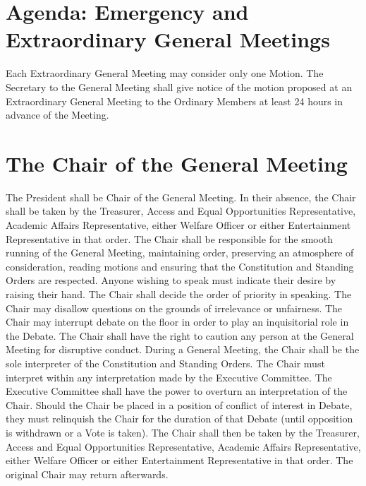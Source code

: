 \section{Agenda: Emergency and Extraordinary General Meetings}
\npara Each Extraordinary General Meeting may consider only one Motion.
\npara The Secretary to the General Meeting shall give notice of the motion proposed at an Extraordinary General Meeting to the Ordinary Members at least 24 hours in advance of the Meeting.
\section{The Chair of the General Meeting}
\npara The President shall be Chair of the General Meeting. In their absence, the Chair shall be taken by the Treasurer, Access and Equal Opportunities Representative, Academic Affairs Representative, either Welfare Officer or either Entertainment Representative in that order.
\npara The Chair shall be responsible for the smooth running of the General Meeting, maintaining order, preserving an atmosphere of consideration, reading motions and ensuring that the Constitution and Standing Orders are respected.
\npara Anyone wishing to speak must indicate their desire by raising their hand. The Chair shall decide the order of priority in speaking.
\npara The Chair may disallow questions on the grounds of irrelevance or unfairness.
\npara The Chair may interrupt debate on the floor in order to play an inquisitorial role in the Debate.
\npara The Chair shall have the right to caution any person at the General Meeting for disruptive conduct.
\npara During a General Meeting, the Chair shall be the sole interpreter of the Constitution and Standing Orders.  The Chair must interpret within any interpretation made by the Executive Committee.  The Executive Committee shall have the power to overturn an interpretation of the Chair.
\npara Should the Chair be placed in a position of conflict of interest in Debate, they must relinquish the Chair for the duration of that Debate (until opposition is withdrawn or a Vote is taken). The Chair shall then be taken by the Treasurer, Access and Equal Opportunities Representative, Academic Affairs Representative, either Welfare Officer or either Entertainment Representative in that order. The original Chair may return afterwards.
